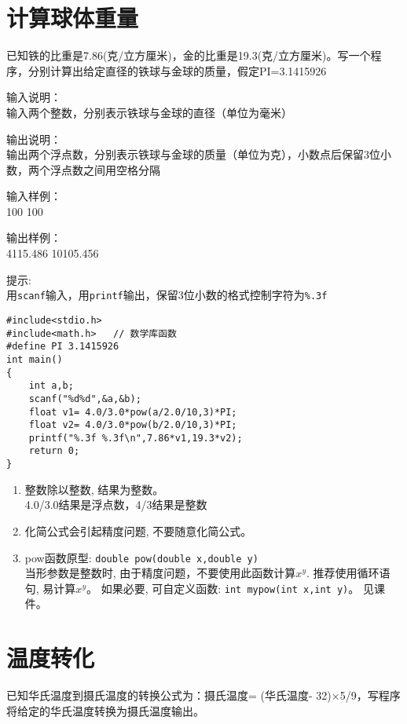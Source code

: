 \section{计算球体重量}
已知铁的比重是7.86(克/立方厘米)，金的比重是19.3(克/立方厘米)。写一个程序，分别计算出给定直径的铁球与金球的质量，假定PI=3.1415926

输入说明：\\
输入两个整数，分别表示铁球与金球的直径（单位为毫米）

输出说明：\\
输出两个浮点数，分别表示铁球与金球的质量（单位为克），小数点后保留3位小数，两个浮点数之间用空格分隔

输入样例：\\
100 100

输出样例：\\
4115.486  10105.456

提示: \\
用\lstinline|scanf|输入，用\lstinline|printf|输出，保留3位小数的格式控制字符为\lstinline|%.3f|

\begin{lstlisting}
#include<stdio.h>
#include<math.h>   // 数学库函数 
#define PI 3.1415926       
int main()                   
{  
	int a,b;
	scanf("%d%d",&a,&b);
	float v1= 4.0/3.0*pow(a/2.0/10,3)*PI;
	float v2= 4.0/3.0*pow(b/2.0/10,3)*PI;
	printf("%.3f %.3f\n",7.86*v1,19.3*v2); 
	return 0;           
}                   
\end{lstlisting}

\begin{note}[要点]
	\begin{enumerate}
		\item 整数除以整数, 结果为整数。\\
		4.0/3.0结果是浮点数，4/3结果是整数
		\item 化简公式会引起精度问题, 不要随意化简公式。
		\item pow函数原型: \lstinline|double pow(double x,double y)|\\
		当形参数是整数时, 由于精度问题，不要使用此函数计算$x^y$. 推荐使用循环语句, 易计算$x^y$。 如果必要, 可自定义函数: \lstinline|int mypow(int x,int y)|。 见课件。
	\end{enumerate}
\end{note}

\section{温度转化}
已知华氏温度到摄氏温度的转换公式为：摄氏温度= (华氏温度- 32)×5/9，写程序将给定的华氏温度转换为摄氏温度输出。

